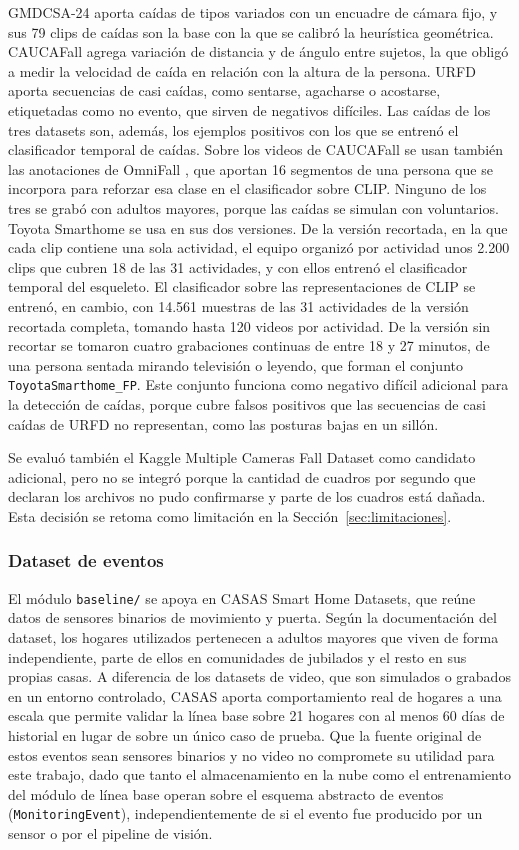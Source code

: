 GMDCSA-24 aporta caídas de tipos variados con un encuadre de cámara fijo, y sus 79 clips de caídas son la base con la que se calibró la heurística geométrica.
CAUCAFall agrega variación de distancia y de ángulo entre sujetos, la que obligó a medir la velocidad de caída en relación con la altura de la persona.
URFD aporta secuencias de casi caídas, como sentarse, agacharse o acostarse, etiquetadas como no evento, que sirven de negativos difíciles.
Las caídas de los tres datasets son, además, los ejemplos positivos con los que se entrenó el clasificador temporal de caídas.
Sobre los videos de CAUCAFall se usan también las anotaciones de OmniFall \parencite{OmniFall2025}, que aportan 16 segmentos de una persona que se incorpora para reforzar esa clase en el clasificador sobre CLIP.
Ninguno de los tres se grabó con adultos mayores, porque las caídas se simulan con voluntarios.
Toyota Smarthome se usa en sus dos versiones.
De la versión recortada, en la que cada clip contiene una sola actividad, el equipo organizó por actividad unos 2.200 clips que cubren 18 de las 31 actividades, y con ellos entrenó el clasificador temporal del esqueleto.
El clasificador sobre las representaciones de CLIP se entrenó, en cambio, con 14.561 muestras de las 31 actividades de la versión recortada completa, tomando hasta 120 videos por actividad.
De la versión sin recortar se tomaron cuatro grabaciones continuas de entre 18 y 27 minutos, de una persona sentada mirando televisión o leyendo, que forman el conjunto \texttt{ToyotaSmarthome\_FP}.
Este conjunto funciona como negativo difícil adicional para la detección de caídas, porque cubre falsos positivos que las secuencias de casi caídas de URFD no representan, como las posturas bajas en un sillón.

Se evaluó también el Kaggle Multiple Cameras Fall Dataset como candidato adicional, pero no se integró porque la cantidad de cuadros por segundo que declaran los archivos no pudo confirmarse y parte de los cuadros está dañada.
Esta decisión se retoma como limitación en la Sección~\ref{sec:limitaciones}.


\subsubsection*{Dataset de eventos}

El módulo \texttt{baseline/} se apoya en CASAS Smart Home Datasets, que reúne datos de sensores binarios de movimiento y puerta.
Según la documentación del dataset, los hogares utilizados pertenecen a adultos mayores que viven de forma independiente, parte de ellos en comunidades de jubilados y el resto en sus propias casas.
A diferencia de los datasets de video, que son simulados o grabados en un entorno controlado, CASAS aporta comportamiento real de hogares a una escala que permite validar la línea base sobre 21 hogares con al menos 60 días de historial en lugar de sobre un único caso de prueba.
Que la fuente original de estos eventos sean sensores binarios y no video no compromete su utilidad para este trabajo, dado que tanto el almacenamiento en la nube como el entrenamiento del módulo de línea base operan sobre el esquema abstracto de eventos (\texttt{MonitoringEvent}), independientemente de si el evento fue producido por un sensor o por el pipeline de visión.

